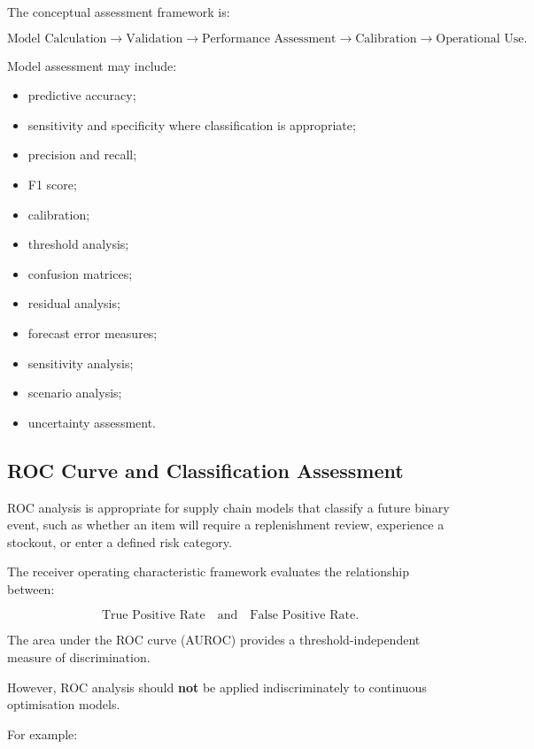 \documentclass[12pt]{article}
\begin{document}
The conceptual assessment framework is:

\[
\text{Model Calculation}
\rightarrow
\text{Validation}
\rightarrow
\text{Performance Assessment}
\rightarrow
\text{Calibration}
\rightarrow
\text{Operational Use}.
\]

Model assessment may include:

\begin{itemize}
    \item predictive accuracy;
    \item sensitivity and specificity where classification is appropriate;
    \item precision and recall;
    \item F1 score;
    \item calibration;
    \item threshold analysis;
    \item confusion matrices;
    \item residual analysis;
    \item forecast error measures;
    \item sensitivity analysis;
    \item scenario analysis;
    \item uncertainty assessment.
\end{itemize}

\subsection{ROC Curve and Classification Assessment}

ROC analysis is appropriate for supply chain models that classify a future
binary event, such as whether an item will require a replenishment review,
experience a stockout, or enter a defined risk category.

The receiver operating characteristic framework evaluates the relationship
between:

\[
\text{True Positive Rate}
\quad\text{and}\quad
\text{False Positive Rate}.
\]

The area under the ROC curve (AUROC) provides a threshold-independent measure
of discrimination.

However, ROC analysis should \textbf{not} be applied indiscriminately to
continuous optimisation models.

For example:
\end{document}
